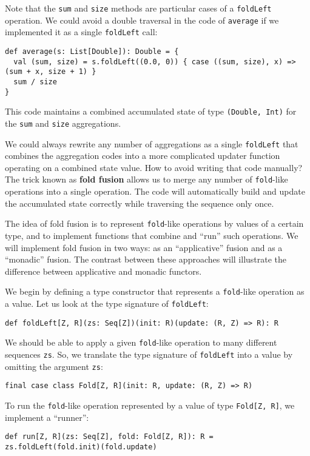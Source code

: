 Note that the \lstinline!sum! and \lstinline!size! methods are particular
cases of a \lstinline!foldLeft! operation. We could avoid a double
traversal in the code of \lstinline!average! if we implemented it
as a single \lstinline!foldLeft! call:
\begin{lstlisting}
def average(s: List[Double]): Double = {
  val (sum, size) = s.foldLeft((0.0, 0)) { case ((sum, size), x) => (sum + x, size + 1) }
  sum / size
}
\end{lstlisting}
This code maintains a combined accumulated state of type \lstinline!(Double, Int)!
for the \lstinline!sum! and \lstinline!size! aggregations. 

We could always rewrite any number of aggregations as a single \lstinline!foldLeft!
that combines the aggregation codes into a more complicated updater
function operating on a combined state value. How to avoid writing
that code manually? The trick known as \textbf{fold fusion}
allows us to merge any number of \lstinline!fold!-like operations
into a single operation. The code will automatically build and update
the accumulated state correctly while traversing the sequence only
once.

The idea of fold fusion is to represent \lstinline!fold!-like operations
by values of a certain type, and to implement functions that combine
and \textsf{``}run\textsf{''} such operations. We will implement fold fusion in two
ways: as an \textsf{``}applicative\textsf{''} fusion and as a \textsf{``}monadic\textsf{''} fusion.
The contrast between these approaches will illustrate the difference
between applicative and monadic functors.

We begin by defining a type constructor that represents a \lstinline!fold!-like
operation as a value. Let us look at the type signature of \lstinline!foldLeft!:
\begin{lstlisting}
def foldLeft[Z, R](zs: Seq[Z])(init: R)(update: (R, Z) => R): R
\end{lstlisting}
We should be able to apply a given \lstinline!fold!-like operation
to many different sequences \lstinline!zs!. So, we translate the
type signature of \lstinline!foldLeft! into a value by omitting the
argument \lstinline!zs!:
\begin{lstlisting}
final case class Fold[Z, R](init: R, update: (R, Z) => R)
\end{lstlisting}
To run the \lstinline!fold!-like operation represented by a value
of type \lstinline!Fold[Z, R]!, we implement a \textsf{``}runner\textsf{''}:
\begin{lstlisting}
def run[Z, R](zs: Seq[Z], fold: Fold[Z, R]): R = zs.foldLeft(fold.init)(fold.update)
\end{lstlisting}

